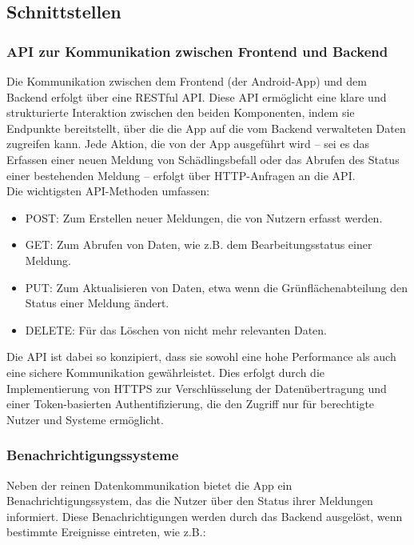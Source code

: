 \subsection{Schnittstellen}

\subsubsection{API zur Kommunikation zwischen Frontend und Backend}

Die Kommunikation zwischen dem Frontend (der Android-App) und dem Backend erfolgt über eine RESTful API. Diese API ermöglicht eine klare und strukturierte Interaktion zwischen den beiden Komponenten, indem sie Endpunkte bereitstellt, über die die App auf die vom Backend verwalteten Daten zugreifen kann. Jede Aktion, die von der App ausgeführt wird – sei es das Erfassen einer neuen Meldung von Schädlingsbefall oder das Abrufen des Status einer bestehenden Meldung – erfolgt über HTTP-Anfragen an die API.\\

Die wichtigsten API-Methoden umfassen:
\begin{itemize}
    \item POST: Zum Erstellen neuer Meldungen, die von Nutzern erfasst werden.
    \item GET: Zum Abrufen von Daten, wie z.B. dem Bearbeitungsstatus einer Meldung.
    \item PUT: Zum Aktualisieren von Daten, etwa wenn die Grünflächenabteilung den Status einer Meldung ändert.
    \item DELETE: Für das Löschen von nicht mehr relevanten Daten.
\end{itemize}

Die API ist dabei so konzipiert, dass sie sowohl eine hohe Performance als auch eine sichere Kommunikation gewährleistet. Dies erfolgt durch die Implementierung von HTTPS zur Verschlüsselung der Datenübertragung und einer Token-basierten Authentifizierung, die den Zugriff nur für berechtigte Nutzer und Systeme ermöglicht.

\subsubsection{Benachrichtigungssysteme}

Neben der reinen Datenkommunikation bietet die App ein Benachrichtigungssystem, das die Nutzer über den Status ihrer Meldungen informiert. Diese Benachrichtigungen werden durch das Backend ausgelöst, wenn bestimmte Ereignisse eintreten, wie z.B.:

